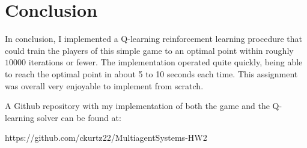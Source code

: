 \documentclass[sigconf]{aamas}
\begin{document}

\section{Conclusion}

In conclusion, I implemented a Q-learning reinforcement learning procedure
that could train the players of this simple game to an optimal point within 
roughly $10000$ iterations or fewer. The implementation operated quite quickly, 
being able to reach the optimal point in about 5 to 10 seconds each time. This
assignment was overall very enjoyable to implement from scratch.

A Github repository with my implementation of both the game and the Q-learning 
solver can be found at: 

https://github.com/ckurtz22/MultiagentSystems-HW2




 


\end{document}
